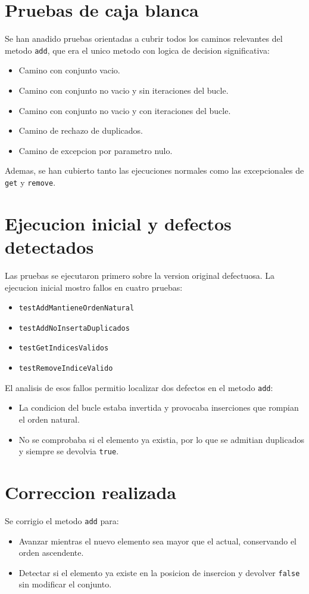 \documentclass[11pt,a4paper]{article}
\begin{document}
\section{Pruebas de caja blanca}
Se han anadido pruebas orientadas a cubrir todos los caminos relevantes del metodo \texttt{add}, que era el unico metodo con logica de decision significativa:
\begin{itemize}
\item Camino con conjunto vacio.
\item Camino con conjunto no vacio y sin iteraciones del bucle.
\item Camino con conjunto no vacio y con iteraciones del bucle.
\item Camino de rechazo de duplicados.
\item Camino de excepcion por parametro nulo.
\end{itemize}
Ademas, se han cubierto tanto las ejecuciones normales como las excepcionales de \texttt{get} y \texttt{remove}.

\section{Ejecucion inicial y defectos detectados}
Las pruebas se ejecutaron primero sobre la version original defectuosa. La ejecucion inicial mostro fallos en cuatro pruebas:
\begin{itemize}
\item \texttt{testAddMantieneOrdenNatural}
\item \texttt{testAddNoInsertaDuplicados}
\item \texttt{testGetIndicesValidos}
\item \texttt{testRemoveIndiceValido}
\end{itemize}

El analisis de esos fallos permitio localizar dos defectos en el metodo \texttt{add}:
\begin{itemize}
\item La condicion del bucle estaba invertida y provocaba inserciones que rompian el orden natural.
\item No se comprobaba si el elemento ya existia, por lo que se admitian duplicados y siempre se devolvia \texttt{true}.
\end{itemize}

\section{Correccion realizada}
Se corrigio el metodo \texttt{add} para:
\begin{itemize}
\item Avanzar mientras el nuevo elemento sea mayor que el actual, conservando el orden ascendente.
\item Detectar si el elemento ya existe en la posicion de insercion y devolver \texttt{false} sin modificar el conjunto.
\end{itemize}
\end{document}
